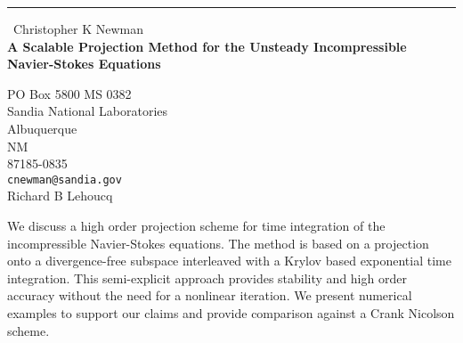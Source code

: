 \documentclass{report}
\begin{document}
\begin{center}
\rule{6in}{1pt} \
{\large Christopher K Newman \\
{\bf A Scalable Projection Method for the Unsteady Incompressible Navier-Stokes Equations}}

PO Box 5800 MS 0382 \\ Sandia National Laboratories \\ Albuquerque \\ NM \\ 87185-0835
\\
{\tt cnewman@sandia.gov}\\
Richard B Lehoucq\end{center}

We discuss a high
order projection scheme for time integration of the
incompressible
Navier-Stokes equations.
The method is based on a
projection onto
a divergence-free subspace interleaved with a
Krylov based exponential time
integration.
This semi-explicit approach
provides stability and high order
accuracy without the need for a nonlinear iteration.
We present numerical examples to support our claims
and provide
comparison against a Crank Nicolson scheme.
\end{document}
